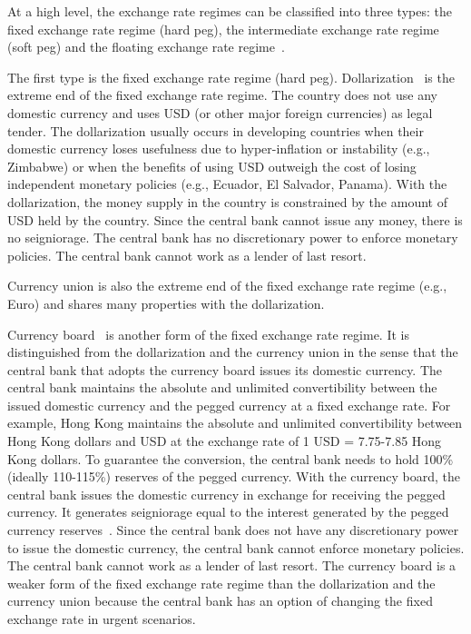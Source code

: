 \documentclass[dvipdfmx,a4paper]{article}
\begin{document}
At a high level, the exchange rate regimes can be classified into three types: the fixed exchange rate regime (hard peg), the intermediate exchange rate regime (soft peg) and the floating exchange rate regime~\cite{ghosh2002exchange}.

The first type is the fixed exchange rate regime (hard peg). Dollarization~\cite{calvo2002dollarization} is the extreme end of the fixed exchange rate regime. The country does not use any domestic currency and uses USD (or other major foreign currencies) as legal tender. The dollarization usually occurs in developing countries when their domestic currency loses usefulness due to hyper-inflation or instability (e.g., Zimbabwe) or when the benefits of using USD outweigh the cost of losing independent monetary policies (e.g., Ecuador, El Salvador, Panama). With the dollarization, the money supply in the country is constrained by the amount of USD held by the country. Since the central bank cannot issue any money, there is no seigniorage. The central bank has no discretionary power to enforce monetary policies. The central bank cannot work as a lender of last resort.

Currency union is also the extreme end of the fixed exchange rate regime (e.g., Euro) and shares many properties with the dollarization.

Currency board~\cite{fabris2013efficiency} is another form of the fixed exchange rate regime. It is distinguished from the dollarization and the currency union in the sense that the central bank that adopts the currency board issues its domestic currency. The central bank maintains the absolute and unlimited convertibility between the issued domestic currency and the pegged currency at a fixed exchange rate. For example, Hong Kong maintains the absolute and unlimited convertibility between Hong Kong dollars and USD at the exchange rate of 1 USD = 7.75-7.85 Hong Kong dollars. To guarantee the conversion, the central bank needs to hold 100\% (ideally 110-115\%) reserves of the pegged currency. With the currency board, the central bank issues the domestic currency in exchange for receiving the pegged currency. It generates seigniorage equal to the interest generated by the pegged currency reserves~\cite{selgin2005currency}. Since the central bank does not have any discretionary power to issue the domestic currency, the central bank cannot enforce monetary policies. The central bank cannot work as a lender of last resort. The currency board is a weaker form of the fixed exchange rate regime than the dollarization and the currency union because the central bank has an option of changing the fixed exchange rate in urgent scenarios.
\end{document}
